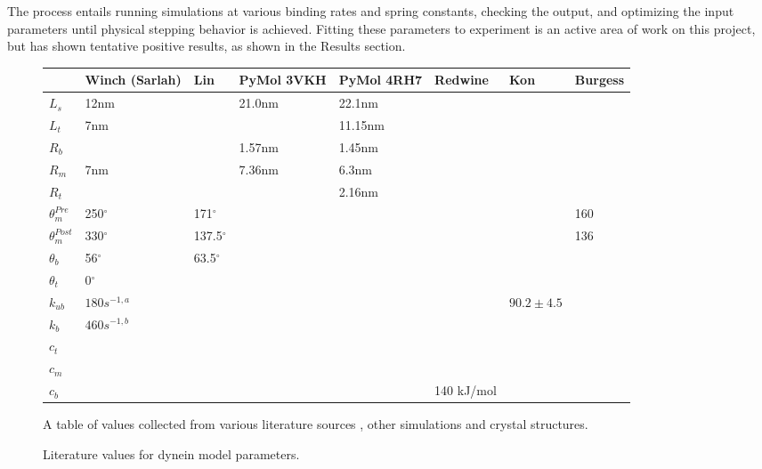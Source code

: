 \documentclass[
11pt, %
english, %
singlespacing, %
headsepline, %
chapterinoneline, %
]{MastersDoctoralThesis} %
\begin{document}
The process entails running simulations at various binding rates and spring constants, checking the output, and optimizing the input parameters until physical stepping behavior is achieved. Fitting these parameters to experiment is an active area of work on this project, but has shown tentative positive results, as shown in the Results section.\\

\begin{figure}[h]
  \centering
  \begin{tabular}{| l | l | l | l | l | l | l | l |}
    \hline
    & Winch (Sarlah) & Lin & PyMol 3VKH & PyMol 4RH7 & Redwine & Kon & Burgess \\\hline
    $L_s$ & 12nm && 21.0nm & 22.1nm & & & \\ \hline
    $L_t$ &  7nm && & 11.15nm & & & \\ \hline
    $R_b$ &  && 1.57nm & 1.45nm & & & \\ \hline
    $R_m$ &  7nm && 7.36nm & 6.3nm & & & \\ \hline
    $R_t$ &  & & &2.16nm & & & \\ \hline
    $\theta_{m}^{Pre}$ & 250$^{\circ}$ &171$^{\circ}$ & & & & & 160\\ \hline
    $\theta_{m}^{Post}$ & 330$^{\circ}$ &137.5$^{\circ}$ & & & & & 136\\ \hline
    $\theta_{b}$ & 56$^{\circ}$ &63.5$^{\circ}$ & & & & & \\ \hline
    $\theta_{t}$ & 0$^{\circ}$ && & & & & \\ \hline
    $k_{ub}$ & $180 s^{-1,a}$ && & & & $90.2 \pm 4.5$& \\ \hline
    $k_b$ & $460 s^{-1,b}$ && & & & & \\ \hline
    $c_t$ & & && & & & \\ \hline
    $c_m$ & & && & & & \\ \hline
    $c_b$ & & && & 140 kJ/mol & & \\ \hline
  \end{tabular}
  \caption{Literature values for dynein model parameters.}{A table of values collected from various literature sources , other simulations and crystal structures.}
  \label{table:parameter-table}
\end{figure}

\end{document}
